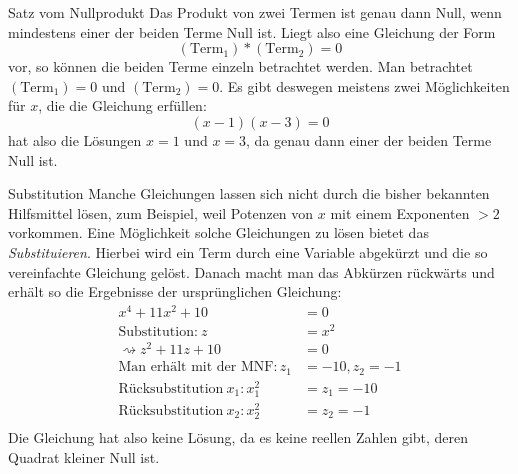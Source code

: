 \begin{bla}{Satz vom Nullprodukt}
  Das Produkt von zwei Termen ist genau dann Null, wenn mindestens einer der beiden Terme Null ist.
  Liegt also eine Gleichung der Form
  \begin{equation*}
    (\text{Term}_1)*(\text{Term}_2)=0
    \end{equation*}
  vor, so können die beiden Terme einzeln betrachtet werden. Man betrachtet $(\text{Term}_1)=0$ und $(\text{Term}_2)=0$. Es gibt deswegen meistens zwei Möglichkeiten für $x$, die die Gleichung erfüllen:
  \begin{equation*}
    (x-1)(x-3) = 0
  \end{equation*}
  hat also die Lösungen $x=1$ und $x=3$, da genau dann einer der beiden Terme Null ist.
\end{bla}

\begin{bla}{Substitution}
  Manche Gleichungen lassen sich nicht durch die bisher bekannten Hilfsmittel lösen, zum Beispiel, weil Potenzen von $x$ mit einem Exponenten $>2$ vorkommen. Eine Möglichkeit solche Gleichungen zu lösen bietet das \emph{Substituieren}. Hierbei wird ein Term durch eine Variable abgekürzt und die
  so vereinfachte Gleichung gelöst. Danach macht man das Abkürzen rückwärts und erhält so die Ergebnisse der ursprünglichen Gleichung:
  \begin{align*}
    x^4+11x^2+10 & = 0 \\
    \text{Substitution:}\ z & = x^2 \\
    \rightsquigarrow z^2+11z+10 & = 0 \\
    \text{Man erhält mit der MNF}: z_1 & = -10, z_2=-1 \\
    \text{Rücksubstitution}\ x_1: x_1^2 & = z_1=-10 \\
    \text{Rücksubstitution}\ x_2: x_2^2 & = z_2=-1 \\
  \end{align*}
  Die Gleichung hat also keine Lösung, da es keine reellen Zahlen gibt, deren Quadrat kleiner Null ist.
\end{bla}
